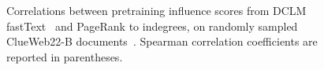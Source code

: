 
\begin{figure}[t]
    \centering
    \caption{Correlations between pretraining influence scores from DCLM fastText~\citep{dclm} and PageRank to indegrees, on randomly sampled  ClueWeb22-B documents~\citep{clueweb22}. Spearman correlation coefficients are reported in parentheses.}
    \label{fig:joint_distribution}
\end{figure} 